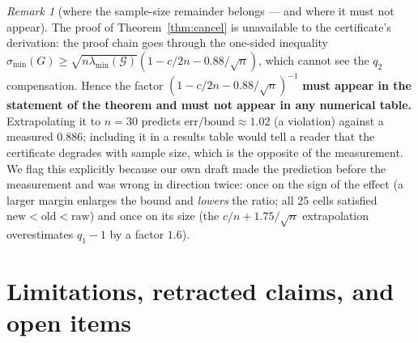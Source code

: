 \documentclass[11pt]{article}
\theoremstyle{remark}
\newtheorem{remark}{Remark}[section]
\newcommand{\Gr}{\mathcal{G}}
\begin{document}
\begin{remark}[where the sample-size remainder belongs --- and where it must not appear]
\label{rem:marginplace}
The proof of Theorem~\ref{thm:cancel} is unavailable to the certificate's derivation:
the proof chain goes through the one-sided inequality
$\sigma_{\min}(G)\ge\sqrt{n\lambda_{\min}(\Gr)}(1-c/2n-0.88/\sqrt n)$, which cannot see
the $q_2$ compensation. Hence the factor $(1-c/2n-0.88/\sqrt n)^{-1}$
\textbf{must appear in the statement of the theorem and must not appear in any numerical
table.} Extrapolating it to $n=30$ predicts $\text{err}/\text{bound}\approx1.02$ (a
violation) against a measured $0.886$; including it in a results table would tell a
reader that the certificate degrades with sample size, which is the opposite of the
measurement. We flag this explicitly because our own draft made the prediction before
the measurement and was wrong in direction twice: once on the sign of the effect
(a larger margin enlarges the bound and \emph{lowers} the ratio; all $25$ cells satisfied
$\text{new}<\text{old}<\text{raw}$) and once on its size (the $c/n+1.75/\sqrt n$
extrapolation overestimates $q_1-1$ by a factor $1.6$).
\end{remark}

\section{Limitations, retracted claims, and open items}\label{sec:notclaims}
\end{document}
